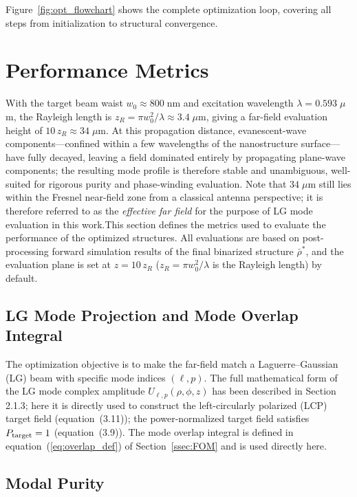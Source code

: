 Figure~\ref{fig:opt_flowchart} shows the complete optimization loop, covering all steps from initialization to structural convergence.



\section{Performance Metrics}

\label{sec:metrics}

With the target beam waist $w_0 \approx 800\;\text{nm}$ and excitation wavelength $\lambda = 0.593\;\mu$m, the Rayleigh length is $z_R = \pi w_0^2/\lambda \approx 3.4\;\mu$m, giving a far-field evaluation height of $10\,z_R \approx 34\;\mu$m. At this propagation distance, evanescent-wave components---confined within a few wavelengths of the nanostructure surface---have fully decayed, leaving a field dominated entirely by propagating plane-wave components; the resulting mode profile is therefore stable and unambiguous, well-suited for rigorous purity and phase-winding evaluation. Note that $34\;\mu$m still lies within the Fresnel near-field zone from a classical antenna perspective; it is therefore referred to as the \textit{effective far field} for the purpose of LG mode evaluation in this work.This section defines the metrics used to evaluate the performance of the optimized structures. All evaluations are based on post-processing forward simulation results of the final binarized structure $\bar{\rho}^*$, and the evaluation plane is set at $z = 10\,z_R$ ($z_R = \pi w_0^2/\lambda$ is the Rayleigh length) by default. 

\subsection{LG Mode Projection and Mode Overlap Integral}

The optimization objective is to make the far-field match a Laguerre--Gaussian (LG) beam with specific mode indices $(\ell, p)$. The full mathematical form of the LG mode complex amplitude $U_{\ell,p} (\rho,\phi,z)$ has been described in Section 2.1.3; here it is directly used to construct the left-circularly polarized (LCP) target field (equation~(3.11)); the power-normalized target field satisfies $P_{\rm target} = 1$ (equation~(3.9)). The mode overlap integral is defined in equation~(\ref{eq:overlap_def}) of Section~\ref{ssec:FOM} and is used directly here.
\subsection{Modal Purity}

